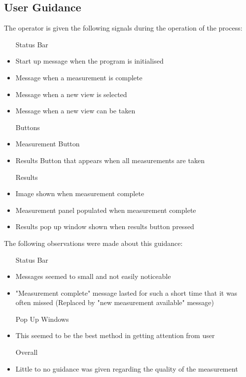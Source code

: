 \subsection{User Guidance}
The operator is given the following signals during the operation of the process:
\begin{itemize}
	\item [Status Bar]
	\item Start up message when the program is initialised
	\item Message when a measurement is complete
	\item Message when a new view is selected
	\item Message when a new view can be taken
	\item [Buttons]
	\item Measurement Button
	\item Results Button that appears when all measurements are taken
	\item [Results]
	\item Image shown when measurement complete
	\item Measurement panel populated when measurement complete
	\item Results pop up window shown when results button pressed
\end{itemize}

The following observations were made about this guidance:
\begin{itemize}
	\item [Status Bar]
	\item Messages seemed to small and not easily noticeable
	\item "Measurement complete" message lasted for such a short time that it was often missed (Replaced by "new measurement available" message)
	\item [Pop Up Windows]
	\item This seemed to be the best method in getting attention from user
	\item [Overall]
	\item Little to no guidance was given regarding the quality of the measurement
\end{itemize}



